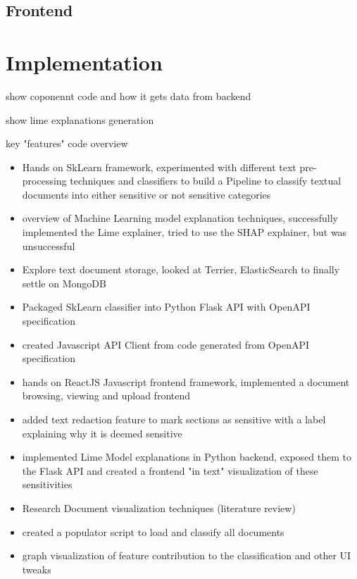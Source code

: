 \documentclass{l4proj}
\begin{document}
\section{Frontend}

\chapter{Implementation}

show coponennt code and how it gets data from backend

show lime explanations generation

key "features" code overview


\begin{itemize}
    \item Hands on SkLearn framework, experimented with different text pre-processing techniques and classifiers to build a Pipeline to classify textual documents into either sensitive or not sensitive categories
    \item overview of Machine Learning model explanation techniques, successfully implemented the Lime explainer, tried to use the SHAP explainer, but was unsuccessful
    \item Explore text document storage, looked at Terrier, ElasticSearch to finally settle on MongoDB
    \item Packaged SkLearn classifier into Python Flask API with OpenAPI specification
    \item created Javascript API Client from code generated from OpenAPI specification
    \item hands on ReactJS Javascript frontend framework, implemented a document browsing, viewing and upload frontend
    \item added text redaction feature to mark sections as sensitive with a label explaining why it is deemed sensitive
    \item implemented Lime Model explanations in Python backend, exposed them to the Flask API and created a frontend "in text" visualization of these sensitivities
    \item Research Document visualization techniques (literature review)
    \item created a populator script to load and classify all documents
    \item graph visualization of feature contribution to the classification and other UI tweaks
\end{itemize}
\end{document}
